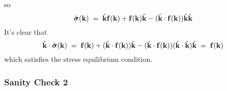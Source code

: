\documentclass[12pt]{article}
\def\bmath#1{\mbox{\boldmath$#1$}}
\begin{document}
so
\begin{equation}
 \tilde{\bmath{\sigma}}({\bf k}) 
 \;=\; \hat{\bf k}{\bf f}({\bf k}) + {\bf f}({\bf k})\hat{\bf k}
- (\hat{\bf k}\cdot{\bf f}({\bf k}))\hat{\bf k}\hat{\bf k}
\end{equation}
It's clear that 
\begin{equation}
 \hat{\bf k}\cdot \tilde{\bmath{\sigma}}({\bf k}) 
 \;=\; {\bf f}({\bf k}) + (\hat{\bf k}\cdot{\bf f}({\bf k}))\hat{\bf k}
- (\hat{\bf k}\cdot{\bf f}({\bf k}))(\hat{\bf k}\cdot\hat{\bf k})\hat{\bf k}
 \;=\; {\bf f}({\bf k})
\end{equation}
which satisfies the stress equilibrium condition.


\subsubsection{Sanity Check 2}




\end{document}
